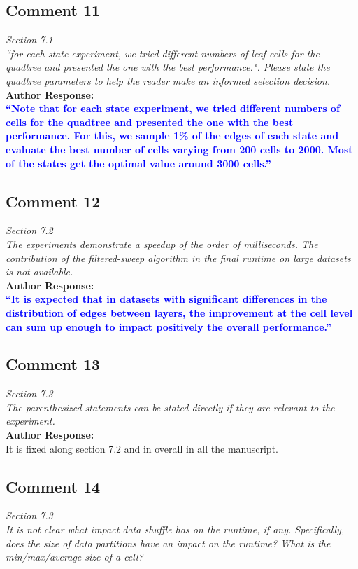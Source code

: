 \documentclass[10pt]{article}
\begin{document}
\subsection*{Comment 11}
\textit{
Section 7.1\\
``for each state experiment, we tried different numbers of leaf cells for the quadtree and presented the one with the best performance.". Please state the quadtree parameters to help the reader make an informed selection decision.
} \\

\textbf{Author Response:}\\

\textbf{\textcolor{blue}{
``Note that for each state experiment, we tried different numbers of cells for the quadtree and presented the one with the best performance. For this, we sample 1\% of the edges of each state and evaluate the best number of cells varying from 200 cells to 2000.  Most of the states get the optimal value around 3000 cells.''
}}

\subsection*{Comment 12}
\textit{
Section 7.2\\
The experiments demonstrate a speedup of the order of milliseconds. The contribution of the filtered-sweep algorithm in the final runtime on large datasets is not available.
} \\

\textbf{Author Response:}\\

\textbf{\textcolor{blue}{
``It is expected that in datasets with significant differences in the distribution of edges between layers, the improvement at the cell level can sum up enough to impact positively the overall performance.''
}}

\subsection*{Comment 13}
\textit{
Section 7.3\\
The parenthesized statements can be stated directly if they are relevant to the experiment.
} \\

\textbf{Author Response:}\\
It is fixed along section 7.2 and in overall in all the manuscript.

\subsection*{Comment 14}
\textit{
Section 7.3\\
It is not clear what impact data shuffle has on the runtime, if any. Specifically, does the size of data partitions have an impact on the runtime? What is the min/max/average size of a cell?
} \\
\end{document}
